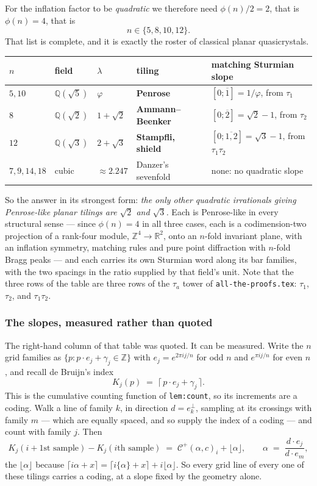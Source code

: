 \documentclass[11pt,a4paper]{article}
\newcommand{\Cp}{\mathcal{C}^{+}}
\newcommand{\Q}{\mathbb{Q}}
\newcommand{\Z}{\mathbb{Z}}
\newcommand{\R}{\mathbb{R}}
\theoremstyle{definition}
\theoremstyle{plain}
\begin{document}
For the inflation factor to be \emph{quadratic} we therefore need
$\phi(n)/2 = 2$, that is $\phi(n) = 4$, that is
\[
  n \in \{5, 8, 10, 12\} .
\]
That list is complete, and it is exactly the roster of classical planar
quasicrystals.

\begin{center}
\begin{tabular}{llllp{4.6cm}}
\toprule
$n$ & field & $\lambda$ & tiling & matching Sturmian slope \\
\midrule
$5, 10$ & $\Q(\sqrt 5)$ & $\varphi$ & \textbf{Penrose} & $[0;\overline{1}] = 1/\varphi$, from $\tau_1$ \\
$8$ & $\Q(\sqrt 2)$ & $1+\sqrt 2$ & \textbf{Ammann--Beenker} & $[0;\overline{2}] = \sqrt 2 - 1$, from $\tau_2$ \\
$12$ & $\Q(\sqrt 3)$ & $2+\sqrt 3$ & \textbf{Stampfli, shield} & $[0;\overline{1,2}] = \sqrt 3 - 1$, from $\tau_1\tau_2$ \\
\midrule
$7,9,14,18$ & cubic & $\approx 2.247$ & Danzer's sevenfold & none: no quadratic slope \\
\bottomrule
\end{tabular}
\end{center}

So the answer in its strongest form: \emph{the only other quadratic irrationals
giving Penrose-like planar tilings are $\sqrt 2$ and $\sqrt 3$.} Each is
Penrose-like in every structural sense --- since $\phi(n) = 4$ in all three
cases, each is a codimension-two projection of a rank-four module, $\Z^4 \to \R^2$,
onto an $n$-fold invariant plane, with an inflation symmetry, matching rules and
pure point diffraction with $n$-fold Bragg peaks --- and each carries its own
Sturmian word along its bar families, with the two spacings in the ratio
supplied by that field's unit. Note that the three rows of the table are three
rows of the $\tau_a$ tower of \texttt{all-the-proofs.tex}: $\tau_1$, $\tau_2$,
and $\tau_1 \tau_2$.

\subsubsection*{The slopes, measured rather than quoted}

The right-hand column of that table was quoted. It can be measured. Write the
$n$ grid families as $\{p : p \cdot e_j + \gamma_j \in \Z\}$ with
$e_j = e^{2\pi i j/n}$ for odd $n$ and $e^{\pi i j/n}$ for even $n$, and recall
de Bruijn's index
\[
  K_j(p) \;=\; \lceil\, p \cdot e_j + \gamma_j \,\rceil .
\]
This is the cumulative counting function of \texttt{lem:count}, so its
increments are a coding. Walk a line of family $k$, in direction
$d = e_k^\perp$, sampling at its crossings with family $m$ --- which are equally
spaced, and so supply the index of a coding --- and count with family $j$. Then
\[
  K_j(\text{$i{+}1$st sample}) - K_j(\text{$i$th sample})
  \;=\; \Cp(\alpha, c)_i + \lfloor \alpha \rfloor ,
  \qquad
  \alpha \;=\; \frac{d \cdot e_j}{d \cdot e_m} ,
\]
the $\lfloor \alpha \rfloor$ because
$\lceil i\alpha + x \rceil = \lceil i\{\alpha\} + x\rceil + i\lfloor\alpha\rfloor$.
So every grid line of every one of these tilings carries a coding, at a slope
fixed by the geometry alone.
\end{document}
